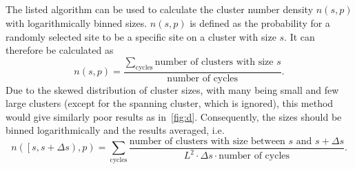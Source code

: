 \documentclass[11pt,british,a4paper]{report}
\begin{document}
%
\subsection{}
The listed algorithm can be used to calculate the cluster number density \(n(s,p)\) with logarithmically binned sizes. \(n(s,p)\) is defined as the probability for a randomly selected site to be a specific site on a cluster with size \(s\). It can therefore be calculated as
\begin{equation}
    n(s,p) = \frac{\displaystyle\sum_{\text{cycles}}\text{number of clusters with size } s}{\text{number of cycles}}.
\end{equation}
Due to the skewed distribution of cluster sizes, with many being small and few large clusters (except for the spanning cluster, which is ignored), this method would give similarly poor results as in~\vref{fig:d}. Consequently, the sizes should be binned logarithmically and the results averaged, i.e.
\begin{equation}
    n\left(\left[s,s+\Delta s\right),p\right) = \displaystyle\sum_{\text{cycles}}\frac{\text{number of clusters with size between } s \text{ and } s+\Delta s}{L^2 \cdot \Delta s \cdot \text{number of cycles}}.
\end{equation}



%
\end{document}
